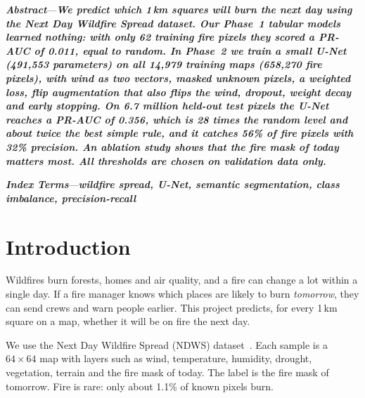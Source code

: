 \documentclass[10pt,letterpaper,twocolumn]{article}
\begin{document}

\noindent\textbf{\textit{Abstract}}---\textit{\textbf{We predict which 1\,km squares will burn the next day
using the Next Day Wildfire Spread dataset. Our Phase~1 tabular models learned
nothing: with only 62 training fire pixels they scored a PR-AUC of 0.011, equal to
random. In Phase~2 we train a small U-Net (491,553 parameters) on all 14,979
training maps (658,270 fire pixels), with wind as two vectors, masked unknown
pixels, a weighted loss, flip augmentation that also flips the wind, dropout,
weight decay and early stopping. On 6.7 million held-out test pixels the U-Net
reaches a PR-AUC of 0.356, which is 28 times the random level and about twice
the best simple rule, and it catches 56\% of fire pixels with 32\% precision. An
ablation study shows that the fire mask of today matters most. All thresholds
are chosen on validation data only.}}

\medskip
\noindent\textbf{\textit{Index Terms}}---\textit{\textbf{wildfire spread, U-Net,
semantic segmentation, class imbalance, precision-recall}}

\section{Introduction}
Wildfires burn forests, homes and air quality, and a fire can change a lot within
a single day. If a fire manager knows which places are likely to burn
\textit{tomorrow}, they can send crews and warn people earlier. This project
predicts, for every 1\,km square on a map, whether it will be on fire the next
day.

We use the Next Day Wildfire Spread (NDWS) dataset~\cite{huot2022}. Each sample
is a $64\times64$ map with layers such as wind, temperature, humidity, drought,
vegetation, terrain and the fire mask of today. The label is the fire mask of
tomorrow. Fire is rare: only about 1.1\% of known pixels burn.
\end{document}
